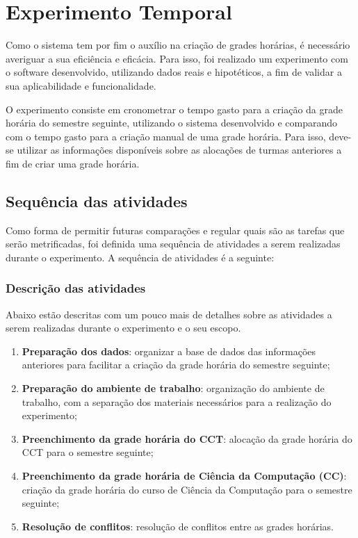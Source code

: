 \chapter{Experimento Temporal} \label{chap:experimentos}

Como o sistema tem por fim o auxílio na criação de grades horárias, é necessário averiguar a sua eficiência e eficácia. Para isso, foi realizado um experimento com o software desenvolvido, utilizando dados reais e hipotéticos, a fim de validar a sua aplicabilidade e funcionalidade.

O experimento consiste em cronometrar o tempo gasto para a criação da grade horária do semestre seguinte, utilizando o sistema desenvolvido e comparando com o tempo gasto para a criação manual de uma grade horária. Para isso, deve-se utilizar as informações disponíveis sobre as alocações de turmas anteriores a fim de criar uma grade horária.

\section{Sequência das atividades}

Como forma de permitir futuras comparações e regular quais são as tarefas que serão metrificadas, foi definida uma sequência de atividades a serem realizadas durante o experimento. A sequência de atividades é a seguinte:

\subsection{Descrição das atividades}

Abaixo estão descritas com um pouco mais de detalhes sobre as atividades a serem realizadas durante o experimento e o seu escopo.

\begin{enumerate}
  \item \textbf{Preparação dos dados}: organizar a base de dados das informações anteriores para facilitar a criação da grade horária do semestre seguinte;
  \item \textbf{Preparação do ambiente de trabalho}: organização do ambiente de trabalho, com a separação dos materiais necessários para a realização do experimento;
  \item \textbf{Preenchimento da grade horária do CCT}: alocação da grade horária do CCT para o semestre seguinte;
  \item \textbf{Preenchimento da grade horária de Ciência da Computação (CC)}: criação da grade horária do curso de Ciência da Computação para o semestre seguinte;
  \item \textbf{Resolução de conflitos}: resolução de conflitos entre as grades horárias.
\end{enumerate}

